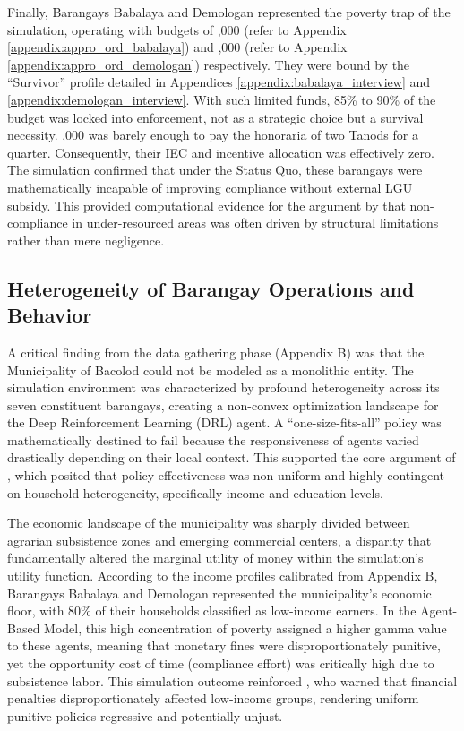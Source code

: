 Finally, Barangays Babalaya and Demologan represented the poverty trap of the simulation, operating with budgets of ,000 (refer to Appendix \ref{appendix:appro_ord_babalaya}) and ,000 (refer to Appendix \ref{appendix:appro_ord_demologan}) respectively. They were bound by the ``Survivor'' profile detailed in Appendices \ref{appendix:babalaya_interview} and \ref{appendix:demologan_interview}. With such limited funds, 85\% to 90\% of the budget was locked into enforcement, not as a strategic choice but a survival necessity. ,000 was barely enough to pay the honoraria of two Tanods for a quarter. Consequently, their IEC and incentive allocation was effectively zero. The simulation confirmed that under the Status Quo, these barangays were mathematically incapable of improving compliance without external LGU subsidy. This provided computational evidence for the argument by \cite{Espino2025} that non-compliance in under-resourced areas was often driven by structural limitations rather than mere negligence.

\subsection{Heterogeneity of Barangay Operations and Behavior}
A critical finding from the data gathering phase (Appendix B) was that the Municipality of Bacolod could not be modeled as a monolithic entity. The simulation environment was characterized by profound heterogeneity across its seven constituent barangays, creating a non-convex optimization landscape for the Deep Reinforcement Learning (DRL) agent. A ``one-size-fits-all'' policy was mathematically destined to fail because the responsiveness of agents varied drastically depending on their local context. This supported the core argument of \cite{Zheng2022}, which posited that policy effectiveness was non-uniform and highly contingent on household heterogeneity, specifically income and education levels.

The economic landscape of the municipality was sharply divided between agrarian subsistence zones and emerging commercial centers, a disparity that fundamentally altered the marginal utility of money within the simulation’s utility function. According to the income profiles calibrated from Appendix B, Barangays Babalaya and Demologan represented the municipality's economic floor, with 80\% of their households classified as low-income earners. In the Agent-Based Model, this high concentration of poverty assigned a higher gamma value to these agents, meaning that monetary fines were disproportionately punitive, yet the opportunity cost of time (compliance effort) was critically high due to subsistence labor. This simulation outcome reinforced \cite{Badua2022}, who warned that financial penalties disproportionately affected low-income groups, rendering uniform punitive policies regressive and potentially unjust.

